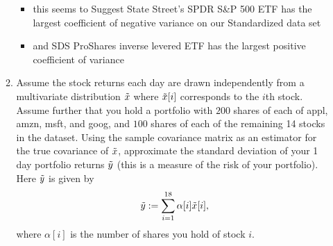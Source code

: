 \documentclass[12pt,twoside]{article}
\begin{document}
\begin{enumerate}
\begin{enumerate}
\begin{itemize}
\begin{center}
\begin{tabular}{c|c|c|c|c|c}
        \end{tabular}
        \end{center}
        \item this seems to Suggest State Street's SPDR S&P 500 ETF has the largest coefficient of negative variance on our Standardized data set 
        \item and SDS ProShares inverse levered ETF has the largest positive coefficient of variance 
    \end{itemize}
  \item Assume the stock returns each day are drawn independently from a
    multivariate distribution $\tilde{  x }$ where
    $\tilde{  x }[i]$ corresponds to the $i$th stock.  Assume further that
    you hold a portfolio with $200$ shares of each of appl, amzn, msft, and
    goog, and $100$ shares of each of the remaining 14 stocks in the
    dataset.  Using the sample covariance matrix as an estimator for
    the true covariance of $\tilde{  x }$, approximate the standard deviation of
    your 1 day portfolio returns $\tilde{  y }$ (this is a measure of the risk of your
    portfolio).  Here $\tilde{  y }$ is given by
    $$\tilde{  y } := \sum_{i=1}^{18} \alpha[i] \tilde{  x }[i],$$
    where $\alpha[i]$ is the number of shares you hold of stock $i$.
    

\end{enumerate}
\end{enumerate}
\end{document}
